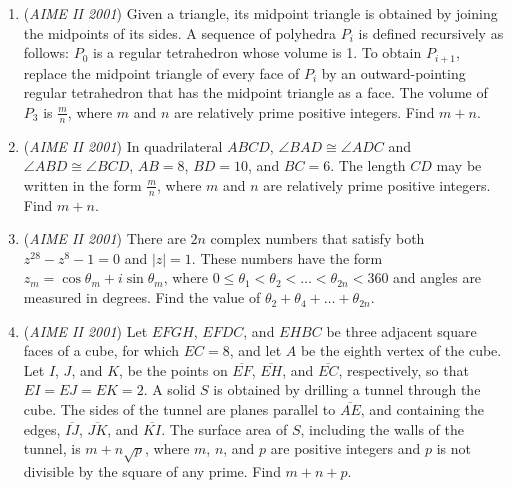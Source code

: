 \begin{enumerate}
 

	\item (\textit{AIME II 2001}) Given a triangle, its midpoint triangle is obtained by joining the midpoints of its sides. A sequence of polyhedra $P_{i}$ is defined recursively as follows: $P_{0}$ is a regular tetrahedron whose volume is 1. To obtain $P_{i + 1}$, replace the midpoint triangle of every face of $P_{i}$ by an outward-pointing regular tetrahedron that has the midpoint triangle as a face. The volume of $P_{3}$ is $\frac {m}{n}$, where $m$ and $n$ are relatively prime positive integers. Find $m + n$.


 

	\item (\textit{AIME II 2001}) In quadrilateral $ABCD$, $\angle{BAD}\cong\angle{ADC}$ and $\angle{ABD}\cong\angle{BCD}$, $AB = 8$, $BD = 10$, and $BC = 6$. The length $CD$ may be written in the form $\frac {m}{n}$, where $m$ and $n$ are relatively prime positive integers. Find $m + n$.


 

	\item (\textit{AIME II 2001}) There are $2n$ complex numbers that satisfy both $z^{28} - z^{8} - 1 = 0$ and $|z| = 1$. These numbers have the form $z_{m} = \cos\theta_{m} + i\sin\theta_{m}$, where $0\leq\theta_{1} < \theta_{2} < \ldots < \theta_{2n} < 360$ and angles are measured in degrees. Find the value of $\theta_{2} + \theta_{4} + \ldots + \theta_{2n}$.


 

	\item (\textit{AIME II 2001}) Let $EFGH$, $EFDC$, and $EHBC$ be three adjacent square faces of a cube, for which $EC = 8$, and let $A$ be the eighth vertex of the cube. Let $I$, $J$, and $K$, be the points on $\overline{EF}$, $\overline{EH}$, and $\overline{EC}$, respectively, so that $EI = EJ = EK = 2$. A solid $S$ is obtained by drilling a tunnel through the cube. The sides of the tunnel are planes parallel to $\overline{AE}$, and containing the edges, $\overline{IJ}$, $\overline{JK}$, and $\overline{KI}$. The surface area of $S$, including the walls of the tunnel, is $m + n\sqrt {p}$, where $m$, $n$, and $p$ are positive integers and $p$ is not divisible by the square of any prime. Find $m + n + p$.


 

\end{enumerate}